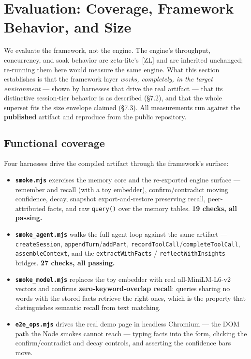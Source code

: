\documentclass[11pt]{article}
\newcommand{\code}[1]{\texttt{#1}}
\begin{document}
\section{Evaluation: Coverage, Framework Behavior, and Size}

We evaluate the framework, not the engine. The engine's throughput, concurrency,
and soak behavior are zeta-lite's~[ZL] and are inherited unchanged; re-running them
here would measure the same engine. What this section establishes is that the
framework layer \emph{works, completely, in the target environment} --- shown by
harnesses that drive the real artifact --- that its distinctive session-tier
behavior is as described (\S7.2), and that the whole superset fits the size
envelope claimed (\S7.3). All measurements run against the \textbf{published}
artifact and reproduce from the public repository.

\subsection{Functional coverage}

Four harnesses drive the compiled artifact through the framework's surface:
\begin{itemize}[leftmargin=1.4em,itemsep=0.2em]
  \item \textbf{\code{smoke.mjs}} exercises the memory core and the re-exported
    engine surface --- remember and recall (with a toy embedder),
    confirm/contradict moving confidence, decay, snapshot export-and-restore
    preserving recall, peer-attributed facts, and raw \code{query()} over the
    memory tables. \textbf{19 checks, all passing.}
  \item \textbf{\code{smoke\_agent.mjs}} walks the full agent loop against the same
    artifact --- \code{createSession}, \code{appendTurn}/\code{addPart},
    \code{recordToolCall}/\code{completeToolCall}, \code{assembleContext}, and the
    \code{extractWithFacts} / \code{reflectWithInsights} bridges. \textbf{27
    checks, all passing.}
  \item \textbf{\code{smoke\_model.mjs}} replaces the toy embedder with real
    all-MiniLM-L6-v2 vectors and confirms \textbf{zero-keyword-overlap recall}:
    queries sharing no words with the stored facts retrieve the right ones, which
    is the property that distinguishes semantic recall from text matching.
  \item \textbf{\code{e2e\_ops.mjs}} drives the real demo page in headless Chromium
    --- the DOM path the Node smokes cannot reach --- typing facts into the form,
    clicking the confirm/contradict and decay controls, and asserting the
    confidence bars move.
\end{itemize}
\end{document}
